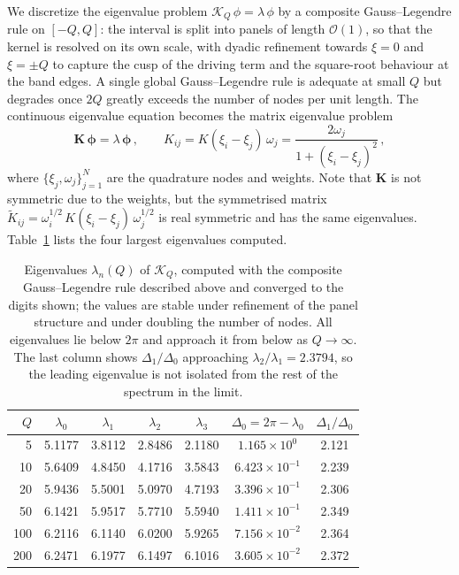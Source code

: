 \documentclass[11pt,a4paper]{article}
\theoremstyle{definition}
\begin{document}
We discretize the eigenvalue problem $\mathcal{K}_Q\, \phi = \lambda\, \phi$
by a composite Gauss--Legendre rule on $[-Q,Q]$: the interval is split into
panels of length $\mathcal O(1)$, so that the kernel is resolved on its own
scale, with dyadic refinement towards $\xi = 0$ and $\xi = \pm Q$ to capture the
cusp of the driving term and the square-root behaviour at the band edges.  A
single global Gauss--Legendre rule is adequate at small $Q$ but degrades once
$2Q$ greatly exceeds the number of nodes per unit length.  The continuous
eigenvalue equation becomes the matrix eigenvalue problem
\begin{equation}
  \mathbf{K}\, \boldsymbol{\phi} = \lambda\, \boldsymbol{\phi}\,,
  \qquad
  K_{ij} = K(\xi_i - \xi_j)\, \omega_j = \frac{2\omega_j}{1+(\xi_i - \xi_j)^2}\,,
\end{equation}
where $\{\xi_j, \omega_j\}_{j=1}^N$ are the quadrature nodes and weights.
Note that $\mathbf{K}$ is not symmetric due to the weights, but the
symmetrised matrix $\tilde{K}_{ij} = \omega_i^{1/2}\, K(\xi_i - \xi_j)\,
\omega_j^{1/2}$ is real symmetric and has the same eigenvalues.
Table~\ref{tab:eigenvalues} lists the four largest eigenvalues computed.


\begin{table}[htbp]
\centering
\begin{tabular}{r c c c c c c}
\hline\hline
$Q$ & $\lambda_0$ & $\lambda_1$ & $\lambda_2$ & $\lambda_3$ & $\Delta_0 = 2\pi - \lambda_0$ & $\Delta_1/\Delta_0$ \\
\hline
5   & 5.1177 & 3.8112 & 2.8486 & 2.1180 & $1.165\times 10^{0}$  & 2.121 \\
10  & 5.6409 & 4.8450 & 4.1716 & 3.5843 & $6.423\times 10^{-1}$ & 2.239 \\
20  & 5.9436 & 5.5001 & 5.0970 & 4.7193 & $3.396\times 10^{-1}$ & 2.306 \\
50  & 6.1421 & 5.9517 & 5.7710 & 5.5940 & $1.411\times 10^{-1}$ & 2.349 \\
100 & 6.2116 & 6.1140 & 6.0200 & 5.9265 & $7.156\times 10^{-2}$ & 2.364 \\
200 & 6.2471 & 6.1977 & 6.1497 & 6.1016 & $3.605\times 10^{-2}$ & 2.372 \\
\hline\hline
\end{tabular}
\caption{Eigenvalues $\lambda_n(Q)$ of $\mathcal{K}_Q$, computed with the
composite Gauss--Legendre rule described above and converged to the digits
shown; the values are stable under refinement of the panel structure and under
doubling the number of nodes.  All eigenvalues lie below $2\pi$ and approach it
from below as $Q \to \infty$.  The last column shows $\Delta_1/\Delta_0$ approaching
$\lambda_2/\lambda_1 = 2.3794$, so the leading eigenvalue is not isolated from
the rest of the spectrum in the limit.}
\label{tab:eigenvalues}
\end{table}
\end{document}
